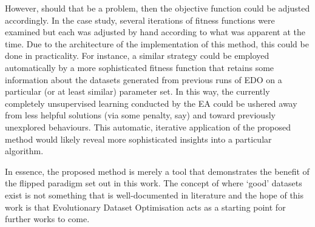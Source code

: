However, should that be a problem, then the objective function could be adjusted
accordingly. In the case study, several iterations of fitness functions were
examined but each was adjusted by hand according to what was apparent at the
time. Due to the architecture of the implementation of this method, this could
be done in practicality. For instance, a similar strategy could be employed
automatically by a more sophisticated fitness function that retains some
information about the datasets generated from previous runs of EDO on a
particular (or at least similar) parameter set. In this way, the currently
completely unsupervised learning conducted by the EA could be ushered away from
less helpful solutions (via some penalty, say) and toward previously unexplored
behaviours. This automatic, iterative application of the proposed method would
likely reveal more sophisticated insights into a particular algorithm.

In essence, the proposed method is merely a tool that demonstrates the benefit
of the flipped paradigm set out in this work. The concept of where `good'
datasets exist is not something that is well-documented in literature and the
hope of this work is that Evolutionary Dataset Optimisation acts as a starting
point for further works to come.
